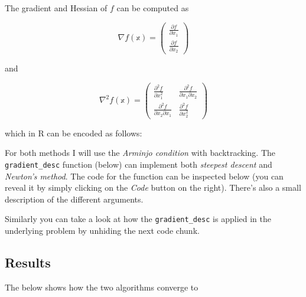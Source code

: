 \documentclass[
]{book}
\begin{document}
The gradient and Hessian of \(f\) can be computed as

\[
\begin{equation}
\nabla f(\mathbb{x})= \begin{pmatrix}
\frac{ \partial f}{\partial x_1} \\
\frac{ \partial f}{\partial x_2}
\end{pmatrix} 
\label{eq:d-rosenbrock}
\end{equation}
\]

and

\[
\begin{equation}
\nabla^2 f(\mathbb{x})= \begin{pmatrix}
\frac{ \partial^2 f}{\partial x_1^2} & \frac{ \partial^2 f}{\partial x_1 \partial x_2} \\
\frac{ \partial^2 f}{\partial x_2\partial x_1} & \frac{ \partial^2 f}{\partial x_2^2}
\end{pmatrix}
\label{eq:dd-rosenbrock}
\end{equation}
\]

which in R can be encoded as follows:

For both methods I will use the \emph{Arminjo condition} with backtracking. The \texttt{gradient\_desc} function (below) can implement both \emph{steepest descent} and \emph{Newton's method}. The code for the function can be inspected below (you can reveal it by simply clicking on the \emph{Code} button on the right). There's also a small description of the different arguments.

Similarly you can take a look at how the \texttt{gradient\_desc} is applied in the underlying problem by unhiding the next code chunk.

\hypertarget{results}{%
\subsection{Results}\label{results}}

The below shows how the two algorithms converge to

  
\end{document}
